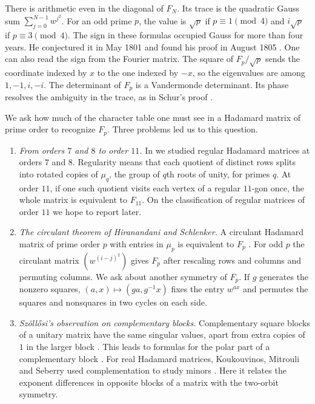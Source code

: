 \documentclass[11pt,a4paper]{article}
\numberwithin{equation}{section}
\begin{document}
There is arithmetic even in the diagonal of $F_N$. Its trace is the quadratic Gauss sum $\sum_{j=0}^{N-1}w^{j^2}$. For an odd prime $p$, the value is $\sqrt p$ if $p\equiv1\pmod4$ and $i\sqrt p$ if $p\equiv3\pmod4$. The sign in these formulas occupied Gauss for more than four years. He conjectured it in May 1801 and found his proof in August 1805 \cite{be}. One can also read the sign from the Fourier matrix. The square of $F_p/\sqrt p$ sends the coordinate indexed by $x$ to the one indexed by $-x$, so the eigenvalues are among $1,-1,i,-i$. The determinant of $F_p$ is a Vandermonde determinant. Its phase resolves the ambiguity in the trace, as in Schur's proof \cite{be}.

\medskip
We ask how much of the character table one must see in a Hadamard matrix of prime order to recognize $F_p$. Three problems led us to this question.

\begin{enumerate}[label=\textbf{\Alph*.},leftmargin=1.8em,labelsep=.5em,itemsep=\medskipamount,topsep=\medskipamount]
\item \emph{From orders $7$ and $8$ to order $11$.} In \cite{gt} we studied regular Hadamard matrices at orders $7$ and $8$. Regularity means that each quotient of distinct rows splits into rotated copies of $\mu_q$, the group of $q$th roots of unity, for primes $q$. At order $11$, if one such quotient visits each vertex of a regular $11$-gon once, the whole matrix is equivalent to $F_{11}$. On the classification of regular matrices of order $11$ we hope to report later.

\item \emph{The circulant theorem of Hiranandani and Schlenker.} A circulant Hadamard matrix of prime order $p$ with entries in $\mu_p$ is equivalent to $F_p$ \cite{hs}. For odd $p$ the circulant matrix $(w^{(i-j)^2})$ gives $F_p$ after rescaling rows and columns and permuting columns. We ask about another symmetry of $F_p$. If $g$ generates the nonzero squares, $(a,x)\mapsto(ga,g^{-1}x)$ fixes the entry $w^{ax}$ and permutes the squares and nonsquares in two cycles on each side.

\item \emph{Sz\"oll\H{o}si's observation on complementary blocks.} Complementary square blocks of a unitary matrix have the same singular values, apart from extra copies of $1$ in the larger block \cite{bns,szthesis}. This leads to formulas for the polar part of a complementary block \cite{bns}. For real Hadamard matrices, Koukouvinos, Mitrouli and Seberry used complementation to study minors \cite{kms1,kms2}. Here it relates the exponent differences in opposite blocks of a matrix with the two-orbit symmetry.
\end{enumerate}
\end{document}
